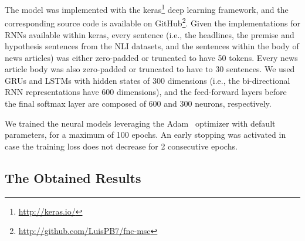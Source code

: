 The model was implemented with the keras\footnote{\scriptsize{\url{http://keras.io/}}} deep learning framework, and the corresponding source code is available on GitHub\footnote{\scriptsize{\url{http://github.com/LuisPB7/fnc-msc}}}. Given the implementations for RNNs available within keras, every sentence (i.e., the headlines, the premise and hypothesis sentences from the NLI datasets, and the sentences within the body of news articles) was either zero-padded or truncated to have 50 tokens. Every news article body was also zero-padded or truncated to have to 30 sentences. We used GRUs and LSTMs with hidden states of 300 dimensions (i.e., the bi-directional RNN representations have 600 dimensions), and the feed-forward layers before the final softmax layer are composed of 600 and 300 neurons, respectively. 

We trained the neural models leveraging the Adam~\cite{kingma2014adam} optimizer with default parameters, for a maximum of 100 epochs. An early stopping was activated in case the training loss does not decrease for 2 consecutive epochs. 

\subsection{The Obtained Results}

